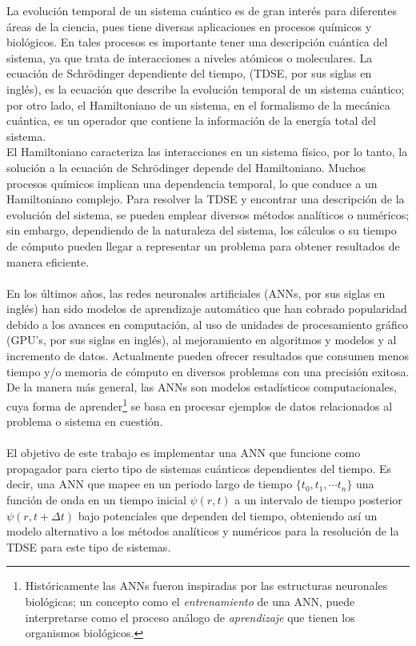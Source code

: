 La evolución temporal de un sistema cuántico es de gran interés para diferentes áreas de la ciencia, pues tiene diversas aplicaciones en procesos químicos y biológicos. En tales procesos es importante tener una descripción cuántica del sistema, ya que trata de interacciones a niveles atómicos o moleculares. La ecuación de Schrödinger dependiente del tiempo, (\acs{TDSE}, por sus siglas en inglés), es la ecuación que describe la evolución temporal de un sistema cuántico; por otro lado, el Hamiltoniano de un sistema, en el formalismo de la mecánica cuántica, es un operador que contiene la información de la energía total del sistema.
\\
El Hamiltoniano caracteriza las interacciones en un sistema físico, por lo tanto, la solución a la ecuación de Schrödinger depende del Hamiltoniano. Muchos procesos químicos implican una dependencia temporal, lo que conduce a un Hamiltoniano complejo. Para resolver la \acs{TDSE} y encontrar una descripción de la evolución del sistema, se pueden emplear diversos métodos analíticos o numéricos; sin embargo, dependiendo de la naturaleza del sistema, los cálculos o su tiempo de cómputo pueden llegar a representar un problema para obtener resultados de manera eficiente.
\\
\\
En los últimos años, las redes neuronales artificiales (\acs{ANN}s, por sus siglas en inglés) han sido modelos de aprendizaje automático que han cobrado popularidad debido a los avances en computación, al uso de unidades de procesamiento gráfico (GPU's, por sus siglas en inglés), al mejoramiento en algoritmos y modelos y al incremento de datos. Actualmente pueden ofrecer resultados que consumen menos tiempo y/o memoria de cómputo en diversos problemas con una precisión exitosa. De la manera más general, las \acs{ANN}s son modelos estadísticos computacionales, cuya forma de aprender\footnote{Históricamente las \acs{ANN}s fueron inspiradas por las estructuras neuronales biológicas; un concepto como el \emph{entrenamiento} de una \acs{ANN}, puede interpretarse como el proceso análogo de \emph{aprendizaje} que tienen los organismos biológicos.} se basa en procesar ejemplos de datos relacionados al problema o sistema en cuestión.
\\
\\
El objetivo de este trabajo es implementar una \acs{ANN} que funcione como propagador para cierto tipo de sistemas cuánticos dependientes del tiempo. Es decir, una \acs{ANN} que mapee en un periodo largo de tiempo $\{t_0,t_1,\cdots t_n\}$ una función de onda en un tiempo inicial $\psi(r,t)$ a un intervalo de tiempo posterior $\psi(r,t+\Delta t)$ bajo potenciales que dependen del tiempo, obteniendo así un modelo alternativo a los métodos analíticos y numéricos para la resolución de la \acs{TDSE} para este tipo de sistemas.

